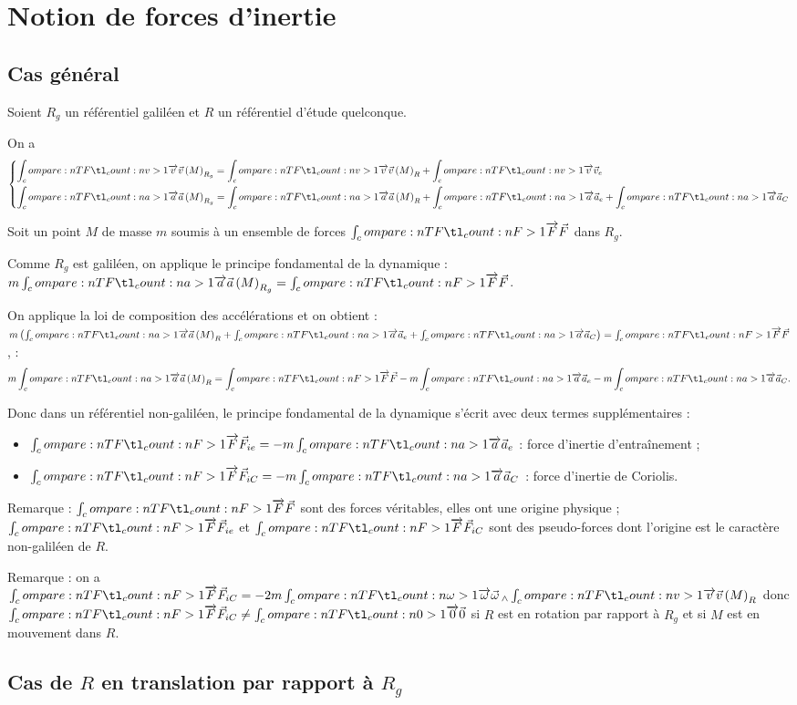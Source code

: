 \section{Notion de forces d'inertie}

\subsection{Cas général}

Soient \(R_g\) un référentiel galiléen et \(R\) un référentiel d'étude quelconque.

On a \[\begin{dcases}
\v{v}\paren{M}_{R_g}=\v{v}\paren{M}_R+\v{v}_e \\
\v{a}\paren{M}_{R_g}=\v{a}\paren{M}_R+\v{a}_e+\v{a}_C
\end{dcases}\]

Soit un point \(M\) de masse \(m\) soumis à un ensemble de forces \(\v{F}\) dans \(R_g\).

Comme \(R_g\) est galiléen, on applique le principe fondamental de la dynamique : \(m\v{a}\paren{M}_{R_g}=\v{F}\).

On applique la loi de composition des accélérations et on obtient : \(m\paren{\v{a}\paren{M}_R+\v{a}_e+\v{a}_C}=\v{F}\), \cad : \[m\v{a}\paren{M}_R=\v{F}-m\v{a}_e-m\v{a}_C.\]

Donc dans un référentiel non-galiléen, le principe fondamental de la dynamique s'écrit avec deux termes supplémentaires :

\begin{itemize}
    \item \(\v{F}_{ie}=-m\v{a}_e\) : force d'inertie d'entraînement ; \\
    \item \(\v{F}_{iC}=-m\v{a}_C\) : force d'inertie de Coriolis. \\
\end{itemize}

Remarque : \(\v{F}\) sont des forces véritables, elles ont une origine physique ; \(\v{F}_{ie}\) et \(\v{F}_{iC}\) sont des pseudo-forces dont l'origine est le caractère non-galiléen de \(R\).

Remarque : on a \(\v{F}_{iC}=-2m\v{\omega}\vecto\v{v}\paren{M}_R\) donc \(\v{F}_{iC}\not=\v{0}\) si \(R\) est en rotation par rapport à \(R_g\) et si \(M\) est en mouvement dans \(R\).

\subsection{Cas de \(R\) en translation par rapport à \(R_g\)}

